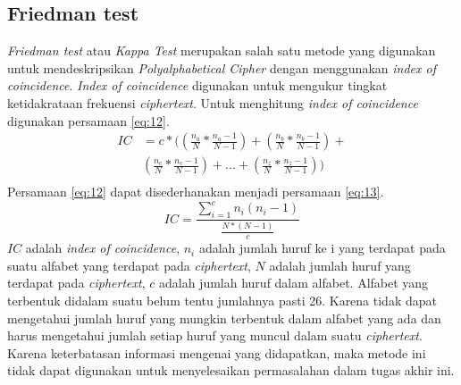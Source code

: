 	\subsection{Friedman test}
	\textit{Friedman test} atau \textit{Kappa Test} merupakan salah satu metode yang digunakan untuk mendeskripsikan \textit{Polyalphabetical Cipher} dengan menggunakan \textit{index of coincidence}. \textit{Index of coincidence} digunakan untuk mengukur tingkat ketidakrataan frekuensi \textit{ciphertext}. Untuk menghitung \textit{index of coincidence} digunakan persamaan \ref{eq:12}\cite{henk_encyclopedia_2005}.
	\begin{equation} \label{eq:12}
	\begin{split}
	IC&=c*((\frac{n_a}{N}*\frac{n_a-1}{N-1})+(\frac{n_b}{N}*\frac{n_b-1}{N-1})+ \\
	&(\frac{n_c}{N}*\frac{n_c-1}{N-1})+...+(\frac{n_z}{N}*\frac{n_z-1}{N-1}))\\
	\end{split}
	\end{equation}
	Persamaan \ref{eq:12} dapat disederhanakan menjadi persamaan \ref{eq:13}.
	\begin{equation} \label{eq:13}
	IC=\frac{\sum_{i=1}^{c}n_i(n_i-1)}{\frac{N*(N-1)}{c}}
	\end{equation}
	$IC$ adalah \textit{index of coincidence}, $n_i$ adalah jumlah huruf ke i yang terdapat pada suatu alfabet yang terdapat pada \textit{ciphertext}, $N$ adalah jumlah huruf yang terdapat pada \textit{ciphertext}, $c$ adalah jumlah huruf dalam alfabet. Alfabet yang terbentuk didalam suatu \ciphertext belum tentu jumlahnya pasti 26. Karena tidak dapat mengetahui jumlah huruf yang mungkin terbentuk dalam alfabet yang ada dan harus mengetahui jumlah setiap huruf yang muncul dalam suatu \textit{ciphertext}. Karena keterbatasan informasi mengenai \ciphertext yang didapatkan, maka metode ini tidak dapat digunakan untuk menyelesaikan permasalahan dalam tugas akhir ini.
	
